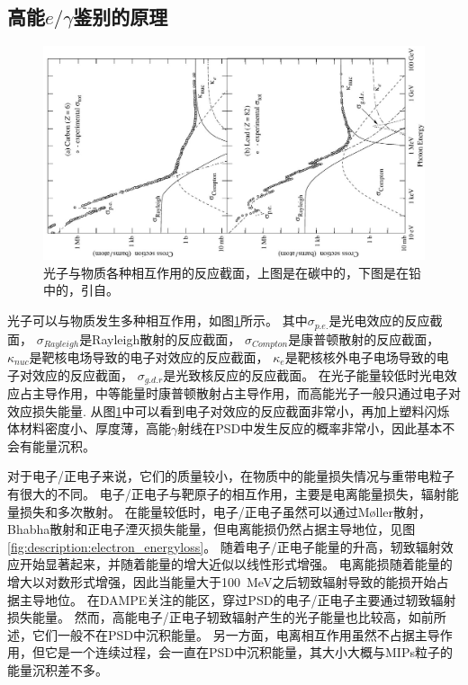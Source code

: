 \subsection{高能$e/\gamma$鉴别的原理}
\begin{figure}[h!]
	\centering
	\includegraphics[width=1.2\linewidth,angle=270]{chap/description/fig/photon_energyloss}
	\caption{光子与物质各种相互作用的反应截面，上图是在碳中的，下图是在铅中的，引自\parencite{pdg_book}。}
	\label{fig:description:photon_energyloss}
\end{figure}

光子可以与物质发生多种相互作用，如图\ref{fig:description:photon_energyloss}所示。
其中${\sigma}_{p.e.}$是光电效应的反应截面，
${\sigma}_{Rayleigh}$是Rayleigh散射的反应截面， 
${\sigma}_{Compton}$是康普顿散射的反应截面，
${\kappa}_{nuc}$是靶核电场导致的电子对效应的反应截面，
${\kappa}_e$是靶核核外电子电场导致的电子对效应的反应截面，
${\sigma}_{g.d.r}$是光致核反应的反应截面。
在光子能量较低时光电效应占主导作用，中等能量时康普顿散射占主导作用，而高能光子一般只通过电子对效应损失能量.
从图\ref{fig:description:photon_energyloss}中可以看到电子对效应的反应截面非常小，再加上塑料闪烁体材料密度小、厚度薄，高能$\gamma$射线在PSD中发生反应的概率非常小，因此基本不会有能量沉积。

对于电子/正电子来说，它们的质量较小，在物质中的能量损失情况与重带电粒子有很大的不同。
电子/正电子与靶原子的相互作用，主要是电离能量损失，辐射能量损失和多次散射。
在能量较低时，电子/正电子虽然可以通过Møller散射，Bhabha散射和正电子湮灭损失能量，但电离能损仍然占据主导地位，见图\ref{fig:description:electron_energyloss}。
随着电子/正电子能量的升高，轫致辐射效应开始显著起来，并随着能量的增大近似以线性形式增强。
电离能损随着能量的增大以对数形式增强，因此当能量大于\SI{100}{MeV}之后轫致辐射导致的能损开始占据主导地位。
在DAMPE关注的能区，穿过PSD的电子/正电子主要通过轫致辐射损失能量。
然而，高能电子/正电子轫致辐射产生的光子能量也比较高，如前所述，它们一般不在PSD中沉积能量。
另一方面，电离相互作用虽然不占据主导作用，但它是一个连续过程，会一直在PSD中沉积能量，其大小大概与MIPs粒子的能量沉积差不多。

